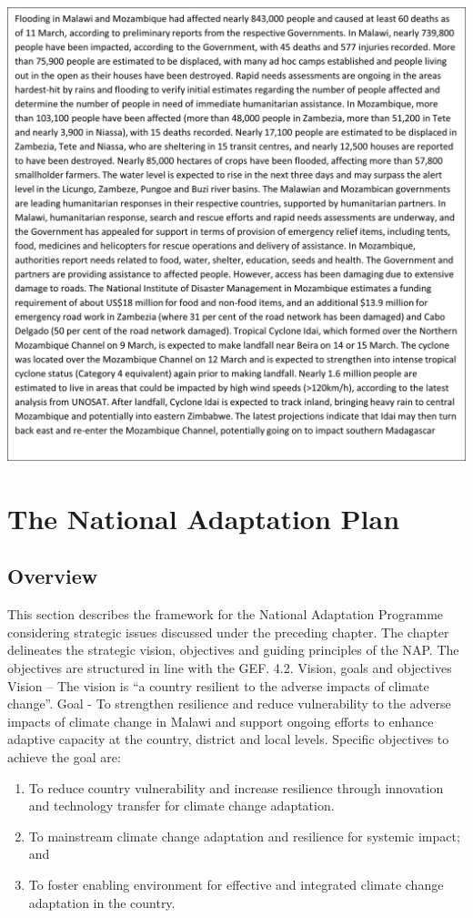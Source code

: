\documentclass[
]{book}
\begin{document}
\includegraphics{images/hazard_box.png}

\hypertarget{the-national-adaptation-plan}{%
\chapter{The National Adaptation Plan}\label{the-national-adaptation-plan}}

\hypertarget{overview-1}{%
\section{Overview}\label{overview-1}}

This section describes the framework for the National Adaptation Programme considering strategic issues discussed under the preceding chapter. The chapter delineates the strategic vision, objectives and guiding principles of the NAP. The objectives are structured in line with the GEF.
4.2. Vision, goals and objectives
Vision -- The vision is ``a country resilient to the adverse impacts of climate change''.
Goal - To strengthen resilience and reduce vulnerability to the adverse impacts of climate change in Malawi and support ongoing efforts to enhance adaptive capacity at the country, district and local levels.
Specific objectives to achieve the goal are:

\begin{enumerate}
\def\labelenumi{(\arabic{enumi})}
\item
  To reduce country vulnerability and increase resilience through innovation and technology transfer for climate change adaptation.
\item
  To mainstream climate change adaptation and resilience for systemic impact; and
\item
  To foster enabling environment for effective and integrated climate change adaptation in the country.
\end{enumerate}
\end{document}
